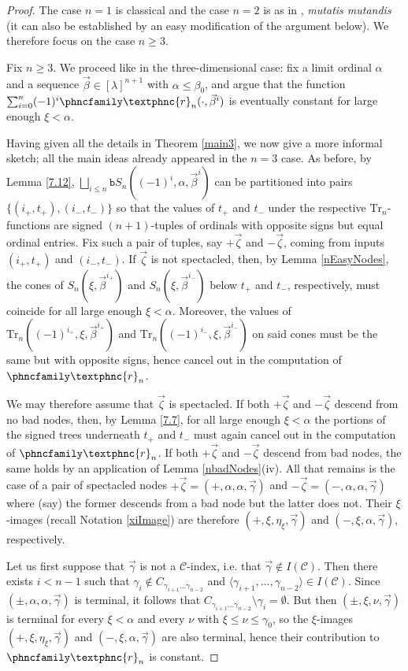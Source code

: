 \documentclass{amsart}
\numberwithin{theorem}{section}
\theoremstyle{definition}
\newcommand{\seq}[1]{{\langle{#1}\rangle}}
\newcommand{\C}{\mathcal{C}}
\newcommand{\Tr}{\mathrm{Tr}}
\newcommand{\bS}{\mathtt{b}S}
\newcommand{\resh}{{\phncfamily\textphnc{r}}}
\begin{document}
\begin{proof}
The case $n=1$ is classical and the case $n=2$ is as in \cite[Theorem 7.2(3)]{bergfalk2024introductionhigherwalks}, \textit{mutatis mutandis} (it can also be established by an easy modification of the argument below). We therefore focus on the case $n\ge 3$.

Fix $n\ge 3$. We proceed like in the three-dimensional case: fix a limit ordinal $\alpha$ and a sequence $\vec\beta\in [\lambda]^{n+1}$ with $\alpha\le\beta_0$, and argue that the function $\sum_{i=0}^n(-1)^i\resh_n(\cdot,\vec\beta^i)$ is eventually constant for large enough $\xi<\alpha$. 



Having given all the details in Theorem \ref{main3}, we now give a more informal sketch; all the main ideas already appeared in the $n=3$ case. As before, by Lemma \ref{7.12}, $\bigsqcup_{i\le n}\bS_n((-1)^i,\alpha,\vec\beta^i)$ can be partitioned into pairs $\{(i_+,t_+),(i_-,t_-)\}$ so that the values of $t_+$ and $t_-$ under the respective $\Tr_n$-functions are signed $(n+1)$-tuples of ordinals 
with opposite signs but equal ordinal entries. Fix such a pair of tuples, say $+\vec\zeta$ and $-\vec\zeta$, coming from inputs $(i_+,t_+)$ and $(i_-,t_-)$. If $\vec\zeta$ is not spectacled, then, by Lemma \ref{nEasyNodes}, the cones of $S_n(\xi,\vec\beta^{i_+})$ and $S_n(\xi,\vec\beta^{i_-})$ below $t_+$ and $t_-$, respectively, must coincide for all large enough $\xi<\alpha$. Moreover, the values of $\Tr_n((-1)^{i_+},\xi,\vec\beta^{i_+})$ and $\Tr_n((-1)^{i_-},\xi,\vec\beta^{i_-})$ on said cones must be the same but with opposite signs, hence cancel out in the computation of $\resh_n$.

We may therefore assume that $\vec\zeta$ is spectacled. If both $+\vec\zeta$ and $-\vec\zeta$ descend from no bad nodes, then, by Lemma \ref{7.7}, for all large enough $\xi<\alpha$ the portions of the signed trees underneath $t_+$ and $t_-$ must again cancel out in the computation of $\resh_n$. If both $+\vec\zeta$ and $-\vec\zeta$ descend from bad nodes, the same holds by an application of Lemma \ref{nbadNodes}(iv). All that remains is the case of a pair of spectacled nodes $+\vec\zeta=(+,\alpha,\alpha,\vec\gamma)$ and $-\vec\zeta=(-,\alpha,\alpha,\vec\gamma)$ where (say) the former descends from a bad node but the latter does not. Their $\xi$-images (recall Notation \ref{xiImage}) are therefore $(+,\xi,\eta_\xi,\vec\gamma)$ and $(-,\xi,\alpha,\vec\gamma)$, respectively.

Let us first suppose that $\vec\gamma$ is not a $\C$-index, i.e. that $\vec\gamma\not\in I(\C)$. Then there exists $i<n-1$ such that $\gamma_i\not\in C_{\gamma_{i+1}\dots\gamma_{n-2}}$ and $\seq{\gamma_{i+1},\dots,\gamma_{n-2}}\in I(\C)$. Since $(\pm,\alpha,\alpha,\vec\gamma)$ is terminal, it follows that $C_{\gamma_{i+1}\dots\gamma_{n-2}}\setminus\gamma_i=\emptyset$. But then $(\pm,\xi,\nu,\vec\gamma)$ is terminal for every $\xi<\alpha$ and every $\nu$ with $\xi\le\nu\le\gamma_0$, so the $\xi$-images $(+,\xi,\eta_\xi,\vec\gamma)$ and $(-,\xi,\alpha,\vec\gamma)$ are also terminal, hence their contribution to $\resh_n$ is constant.


\end{proof}
\end{document}
